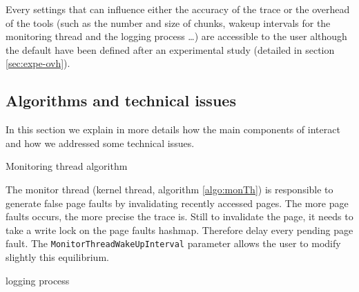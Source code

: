 Every settings that can influence either the accuracy of the trace or the
overhead of the tools (such as the number and size of chunks, wakeup intervals
for the monitoring thread and the logging process \ldots) are accessible to the
user although the default have been defined after an experimental study
(detailed in section \ref{sec:expe-ovh}).

\subsection{Algorithms and technical issues}
\label{sec:design-tech}

In this section we explain in more details how the main components of \Moca
interact and how we addressed some technical issues.

\begin{algorithm}[htb]
    \caption{Monitoring thread algorithm}
    \label{algo:monTh}
    \begin{algorithmic}[1]
        \State {}
                    \State {}
                    \State {}
                    \State {}
                \EndFor
            \EndFor
            \State {}
        \EndWhile
    \end{algorithmic}
\end{algorithm}

The monitor thread (kernel thread, algorithm \ref{algo:monTh}) is
responsible to generate false page faults by invalidating
recently accessed pages. The more page faults occurs, the more
precise the trace is. Still to invalidate the page, it needs
to take a write lock on the page faults hashmap. Therefore
delay every pending page fault. The
\texttt{MonitorThreadWakeUpInterval} parameter allows the user
to modify slightly this equilibrium.

\begin{algorithm}[htb]
    \caption{logging process}
    \label{algo:flushTh}
    \begin{algorithmic}[1]
                \State {}
                \State {}
                \State {}
                \EndFor
            \EndFor
            \State {}
        \EndWhile
    \end{algorithmic}
\end{algorithm}

